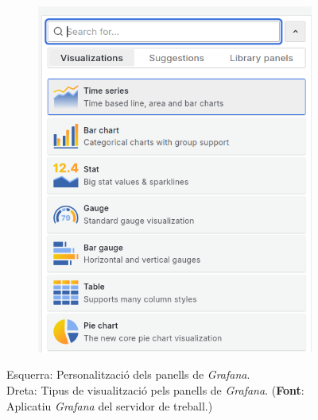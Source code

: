 \begin{figure}[h]
\begin{subfigure}{0.45\textwidth}
        \includegraphics[width=\linewidth]{figures/grafana-panel-visualization-type}
        \label{fig:figure2}
    \end{subfigure}
    \captionsetup{justification=centering}
    \caption[Esquerra: Personalització dels panells de \textit{Grafana}. Dreta: Tipus de visualització pels panells de \textit{Grafana}.]{Esquerra: Personalització dels panells de \textit{Grafana}. \\ Dreta: Tipus de visualització pels panells de \textit{Grafana}. (\textbf{Font}: Aplicatiu \textit{Grafana} del servidor de treball.)}
    \label{fig:grafana-panel-visualization}
\end{figure}
